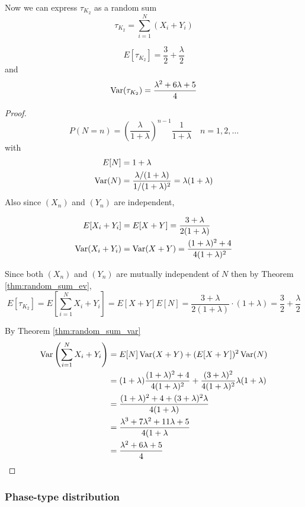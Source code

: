 Now we can express $\tau_{K_2}$ as a random sum
$$
\tau_{K_2} = \sum_{i = 1}^N (X_i + Y_i)
$$

\begin{theorem}
$$
E[\tau_{K_2}] = \frac{3}{2} + \frac{\lambda}{2}
$$
and
$$
\operatorname {Var}(\tau_{K_2}) = \frac{\lambda^2 + 6 \lambda + 5}{4}
$$
\end{theorem}

\begin{proof}
$$
P(N = n) = \left(\frac{\lambda}{1 + \lambda} \right)^{n - 1} \frac{1}{1 + \lambda} \quad n = 1,2,\ldots
$$
with
\begin{align*}
    E[N] &= 1 + \lambda\\
    \operatorname {Var}(N) &= \frac{\lambda/(1 + \lambda)}{1/(1 + \lambda)^2} = \lambda (1 + \lambda)
\end{align*}
Also since $(X_n)$ and $(Y_n)$ are independent,

\begin{align*}
    E[X_i + Y_i] &= E[X + Y] = \frac{3 + \lambda}{2(1 + \lambda)}\\
    \operatorname {Var}(X_i + Y_i) &= \operatorname {Var}(X + Y) = \frac{(1 + \lambda)^2 + 4}{4(1 + \lambda)^2}
\end{align*}

Since both $(X_n)$ and $(Y_n)$ are mutually independent of $N$ then by Theorem \eqref{thm:random_sum_ev},
$$
E[\tau_{K_2}] = E\left[ \sum_{i = 1}^N X_i + Y_i \right] = E[X + Y] E[N] = \frac{3 + \lambda}{2(1 + \lambda)} \cdot (1 + \lambda) = \frac{3}{2} + \frac{\lambda}{2}
$$

By Theorem \ref{thm:random_sum_var}
\begin{align*}
    \operatorname {Var}\left( \sum_{i = 1}^N X_i + Y_i \right) &= E[N]\operatorname {Var}(X + Y) + (E[X + Y])^2 \operatorname {Var}(N)\\
    &= (1 + \lambda) \frac{(1 + \lambda)^2 + 4}{4(1 + \lambda)^2} + \frac{(3 + \lambda)^2}{4 (1 + \lambda)^2} \lambda (1 + \lambda)\\
    &= \frac{
        (1 + \lambda)^2 + 4 + (3 + \lambda)^2 \lambda
    }{4(1 + \lambda)}\\
    &= \frac{
    \lambda^3 + 7 \lambda^2 + 11 \lambda + 5
    }{4(1 + \lambda}\\
    &= \frac{\lambda^2 + 6 \lambda + 5}{4}
\end{align*}
\end{proof}

\subsubsection{Phase-type distribution}

